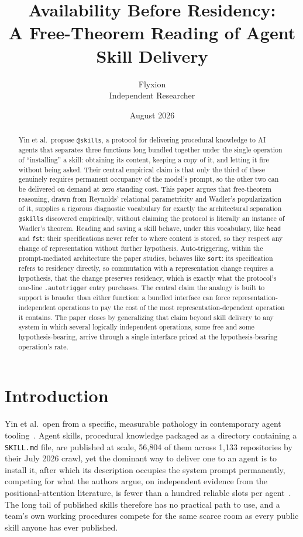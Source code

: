 \documentclass[11pt]{article}
\title{Availability Before Residency: \\ A Free-Theorem Reading of Agent Skill Delivery}
\author{Flyxion \\ \small Independent Researcher}
\date{August 2026}
\begin{document}
\maketitle

\begin{abstract}
Yin et al.\ propose \texttt{@skills}, a protocol for delivering procedural knowledge to AI agents that separates three functions long bundled together under the single operation of ``installing'' a skill: obtaining its content, keeping a copy of it, and letting it fire without being asked. Their central empirical claim is that only the third of these genuinely requires permanent occupancy of the model's prompt, so the other two can be delivered on demand at zero standing cost. This paper argues that free-theorem reasoning, drawn from Reynolds' relational parametricity and Wadler's popularization of it, supplies a rigorous diagnostic vocabulary for exactly the architectural separation \texttt{@skills} discovered empirically, without claiming the protocol is literally an instance of Wadler's theorem. Reading and saving a skill behave, under this vocabulary, like \texttt{head} and \texttt{fst}: their specifications never refer to where content is stored, so they respect any change of representation without further hypothesis. Auto-triggering, within the prompt-mediated architecture the paper studies, behaves like \texttt{sort}: its specification refers to residency directly, so commutation with a representation change requires a hypothesis, that the change preserves residency, which is exactly what the protocol's one-line \texttt{.autotrigger} entry purchases. The central claim the analogy is built to support is broader than either function: a bundled interface can force representation-independent operations to pay the cost of the most representation-dependent operation it contains. The paper closes by generalizing that claim beyond skill delivery to any system in which several logically independent operations, some free and some hypothesis-bearing, arrive through a single interface priced at the hypothesis-bearing operation's rate.
\end{abstract}

\section{Introduction}

Yin et al.\ open from a specific, measurable pathology in contemporary agent tooling~\cite{skills2026}. Agent skills, procedural knowledge packaged as a directory containing a \texttt{SKILL.md} file, are published at scale, 56{,}804 of them across 1{,}133 repositories by their July 2026 crawl, yet the dominant way to deliver one to an agent is to install it, after which its description occupies the system prompt permanently, competing for what the authors argue, on independent evidence from the positional-attention literature, is fewer than a hundred reliable slots per agent~\cite{liu2024lost,laban2025lost}. The long tail of published skills therefore has no practical path to use, and a team's own working procedures compete for the same scarce room as every public skill anyone has ever published.
\end{document}
